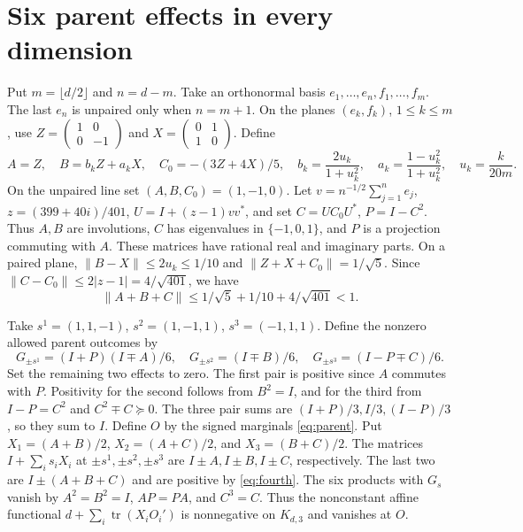 \documentclass[10pt,a4paper]{article}
\newcommand{\tr}{\operatorname{tr}}
\begin{document}
\section{Six parent effects in every dimension}
Put \(m=\lfloor d/2\rfloor\) and \(n=d-m\). Take an orthonormal basis \(e_1,\dots,e_n,f_1,\dots,f_m\). The last \(e_n\) is unpaired only when \(n=m+1\). On the planes \((e_k,f_k)\), \(1\le k\le m\), use \(Z=\left(\begin{smallmatrix}1&0\\0&-1\end{smallmatrix}\right)\) and \(X=\left(\begin{smallmatrix}0&1\\1&0\end{smallmatrix}\right)\). Define
\[
 A=Z,\quad
 B=b_kZ+a_kX,\quad
 C_0=-(3Z+4X)/5,\quad
 b_k=\frac{2u_k}{1+u_k^2},\quad a_k=\frac{1-u_k^2}{1+u_k^2},
 \quad u_k=\frac{k}{20m}.
\]
On the unpaired line set \((A,B,C_0)=(1,-1,0)\). Let \(v=n^{-1/2}\sum_{j=1}^n e_j\), \(z=(399+40i)/401\), \(U=I+(z-1)vv^*\), and set \(C=UC_0U^*\), \(P=I-C^2\). Thus \(A,B\) are involutions, \(C\) has eigenvalues in \(\{-1,0,1\}\), and \(P\) is a projection commuting with \(A\). These matrices have rational real and imaginary parts. On a paired plane,
\(\|B-X\|\le2u_k\le1/10\) and \(\|Z+X+C_0\|=1/\sqrt5\). Since \(\|C-C_0\|\le2|z-1|=4/\sqrt{401}\), we have
\begin{equation}\label{eq:fourth}
 \|A+B+C\|\le1/\sqrt5+1/10+4/\sqrt{401}<1 .
\end{equation}

Take \(s^1=(1,1,-1)\), \(s^2=(1,-1,1)\), \(s^3=(-1,1,1)\). Define the nonzero allowed parent outcomes by
\begin{equation}\label{eq:six}
 G_{\pm s^1}=(I+P)(I\mp A)/6,\quad
 G_{\pm s^2}=(I\mp B)/6,\quad
 G_{\pm s^3}=(I-P\mp C)/6 .
\end{equation}
Set the remaining two effects to zero. The first pair is positive since \(A\) commutes with \(P\). Positivity for the second follows from \(B^2=I\), and for the third from \(I-P=C^2\) and \(C^2\mp C\succeq0\). The three pair sums are \((I+P)/3,I/3,(I-P)/3\), so they sum to \(I\). Define \(O\) by the signed marginals \eqref{eq:parent}. Put \(X_1=(A+B)/2\), \(X_2=(A+C)/2\), and \(X_3=(B+C)/2\). The matrices \(I+\sum_i s_iX_i\) at \(\pm s^1,\pm s^2,\pm s^3\) are \(I\pm A,I\pm B,I\pm C\), respectively. The last two are \(I\pm(A+B+C)\) and are positive by \eqref{eq:fourth}. The six products with \(G_s\) vanish by \(A^2=B^2=I\), \(AP=PA\), and \(C^3=C\). Thus the nonconstant affine functional \(d+\sum_i\tr(X_i O_i')\) is nonnegative on \(K_{d,3}\) and vanishes at \(O\).
\end{document}
